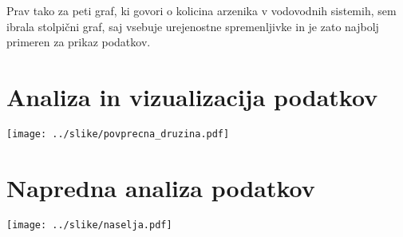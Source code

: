 \documentclass[11pt,a4paper]{article}
\begin{document}
Prav tako za peti graf, ki govori o kolicina arzenika v vodovodnih sistemih, sem ibrala stolpični graf, saj vsebuje urejenostne spremenljivke in je zato najbolj primeren za prikaz podatkov.


\section{Analiza in vizualizacija podatkov}

\texttt{[image: ../slike/povprecna\_druzina.pdf]}

\section{Napredna analiza podatkov}

\texttt{[image: ../slike/naselja.pdf]}
\end{document}
